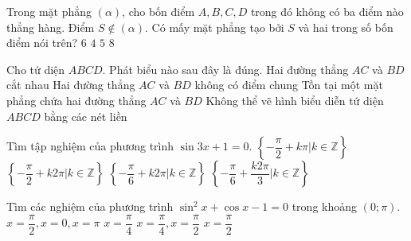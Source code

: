 \begin{ex}%
	Trong mặt phẳng $(\alpha )$, cho bốn điểm  $A,B,C,D$  trong đó không có ba điểm nào thẳng hàng. Điểm $S \notin (\alpha)$. Có mấy mặt phẳng tạo bởi  $S$  và hai trong số bốn điểm nói trên?
	\choice
	{\True $6$}
	{$4$}
	{$5$}
	{$8$}
\end{ex}
\begin{ex}%
	Cho tứ diện $ABCD$. Phát biểu nào sau đây là đúng.
	\choice
	{Hai đường thẳng $AC$ và $BD$ cắt nhau}
	{\True Hai đường thẳng $AC$ và $BD$ không có điểm chung}
	{Tồn tại một mặt phẳng chứa hai đường thẳng $AC$ và $BD$}
	{Không thể vẽ hình biểu diễn tứ diện $ABCD$ bằng các nét liền}
\end{ex}
\begin{ex}%
	Tìm tập nghiệm của phương trình $\sin 3x + 1 = 0$.
	\choice
	{$\left\{-\dfrac{\pi}{2}+k\pi|k\in\mathbb{Z} \right\}$}
	{$\left\{-\dfrac{\pi}{2}+k2\pi|k\in\mathbb{Z} \right\}$}
	{$\left\{-\dfrac{\pi}{6}+k2\pi|k\in\mathbb{Z} \right\}$}
	{\True $\left\{-\dfrac{\pi}{6}+\dfrac{k2\pi}{3}|k\in\mathbb{Z} \right\}$}
\end{ex}
\begin{ex}%
	Tìm các nghiệm của phương trình $\sin^2x + \cos x - 1 = 0$ trong khoảng $(0;\pi)$.
	\choice
	{$x = \dfrac{\pi }{2},x = 0,x = \pi $}
	{$x = \dfrac{\pi }{4}$}
	{$x = \dfrac{\pi }{4},x = \dfrac{\pi }{2}$}
	{\True $x = \dfrac{\pi }{2}$}
	\loigiai{
		Xét phương trình: ${\sin ^2}x + \cos x - 1 = 0 \Leftrightarrow  - {\cos ^2}x + \cos x = 0$.\\
		$ \left[\begin{aligned}& \cos x=0 \\ & \cos x =1\end{aligned}\right. \Leftrightarrow \left[\begin{aligned}& x=\dfrac{\pi}{2}+k\pi\\ & x=k2\pi\end{aligned}\right., k\in\mathbb{Z}$.
		Vì $x \in \left( {0;\pi } \right) \Rightarrow x = \dfrac{\pi }{2}$.}
\end{ex}
